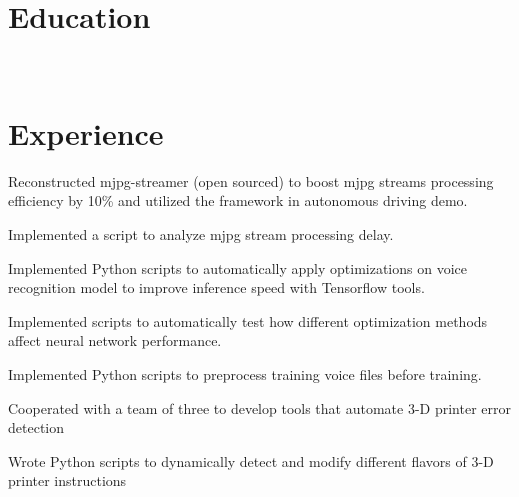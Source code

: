 \documentclass[]{deedy-resume-openfont}
\begin{document}
    
%
%
%
%
\section{Education}
\raggedright

\hfill {}\\

\sectionsep
%
%
\section{Experience}
\hfill {}
\begin{tightemize}
	\item Reconstructed mjpg-streamer (open sourced) to boost mjpg streams processing efficiency by 10\% and utilized the framework in autonomous driving demo.
	\item Implemented a script to analyze mjpg stream processing delay.
\end{tightemize}
\sectionsep

\hfill {}
\begin{tightemize}
	\item Implemented Python scripts to automatically apply optimizations on voice recognition model to improve inference speed with Tensorflow tools.
	\item Implemented scripts to automatically test how different optimization methods affect neural network performance.
	\item Implemented Python scripts to preprocess training voice files before training.
\end{tightemize}
\sectionsep

\hfill {}
\begin{tightemize}
	\item Cooperated with a team of three to develop tools that automate 3-D printer error detection
	\item Wrote Python scripts to dynamically detect and modify different flavors of 3-D printer instructions
	

\end{tightemize}
\end{document}
